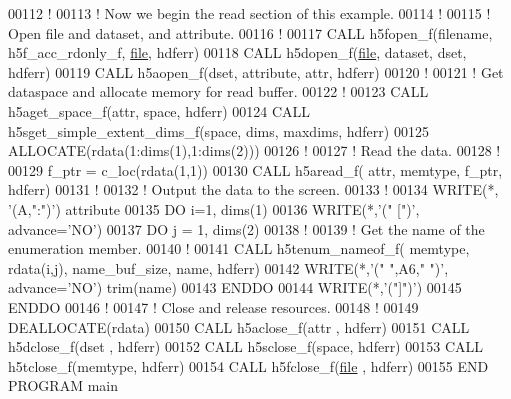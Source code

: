 \begin{DoxyCode}
00112   \textcolor{comment}{!}
00113   \textcolor{comment}{! Now we begin the read section of this example.}
00114   \textcolor{comment}{!}
00115   \textcolor{comment}{! Open file and dataset, and attribute.}
00116   \textcolor{comment}{!}
00117   \textcolor{keyword}{CALL }h5fopen\_f(filename, h5f\_acc\_rdonly\_f, \hyperlink{structfile}{file}, hdferr)
00118   \textcolor{keyword}{CALL }h5dopen\_f(\hyperlink{structfile}{file}, dataset, dset, hdferr)
00119   \textcolor{keyword}{CALL }h5aopen\_f(dset, attribute, attr, hdferr)
00120   \textcolor{comment}{!}
00121   \textcolor{comment}{! Get dataspace and allocate memory for read buffer.}
00122   \textcolor{comment}{!}
00123   \textcolor{keyword}{CALL }h5aget\_space\_f(attr, space, hdferr)
00124   \textcolor{keyword}{CALL }h5sget\_simple\_extent\_dims\_f(space, dims, maxdims, hdferr)
00125   \textcolor{keyword}{ALLOCATE}(rdata(1:dims(1),1:dims(2)))
00126   \textcolor{comment}{!}
00127   \textcolor{comment}{! Read the data.}
00128   \textcolor{comment}{!}
00129   f\_ptr = c\_loc(rdata(1,1))
00130   \textcolor{keyword}{CALL }h5aread\_f( attr, memtype, f\_ptr, hdferr)
00131   \textcolor{comment}{!}
00132   \textcolor{comment}{! Output the data to the screen.}
00133   \textcolor{comment}{!}
00134   \textcolor{keyword}{WRITE}(*, \textcolor{stringliteral}{'(A,":")'}) attribute
00135   \textcolor{keywordflow}{DO} i=1, dims(1)
00136      \textcolor{keyword}{WRITE}(*,\textcolor{stringliteral}{'(" [")'}, advance=\textcolor{stringliteral}{'NO'})
00137      \textcolor{keywordflow}{DO} j = 1, dims(2)
00138         \textcolor{comment}{!}
00139         \textcolor{comment}{! Get the name of the enumeration member.}
00140         \textcolor{comment}{!}
00141         \textcolor{keyword}{CALL }h5tenum\_nameof\_f( memtype, rdata(i,j), name\_buf\_size, name, hdferr) 
00142         \textcolor{keyword}{WRITE}(*,\textcolor{stringliteral}{'(" ",A6," ")'}, advance=\textcolor{stringliteral}{'NO'}) trim(name)
00143 \textcolor{keywordflow}{     ENDDO}
00144      \textcolor{keyword}{WRITE}(*,\textcolor{stringliteral}{'("]")'})
00145 \textcolor{keywordflow}{  ENDDO}
00146   \textcolor{comment}{!}
00147   \textcolor{comment}{! Close and release resources.}
00148   \textcolor{comment}{!}
00149   \textcolor{keyword}{DEALLOCATE}(rdata)
00150   \textcolor{keyword}{CALL }h5aclose\_f(attr , hdferr)
00151   \textcolor{keyword}{CALL }h5dclose\_f(dset , hdferr)
00152   \textcolor{keyword}{CALL }h5sclose\_f(space, hdferr)
00153   \textcolor{keyword}{CALL }h5tclose\_f(memtype, hdferr)
00154   \textcolor{keyword}{CALL }h5fclose\_f(\hyperlink{structfile}{file} , hdferr)
00155 \textcolor{keyword}{END PROGRAM }main
\end{DoxyCode}
